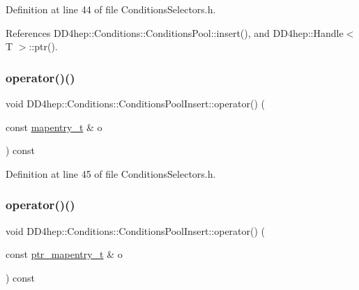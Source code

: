 Definition at line 44 of file Conditions\+Selectors.\+h.



References D\+D4hep\+::\+Conditions\+::\+Conditions\+Pool\+::insert(), and D\+D4hep\+::\+Handle$<$ T $>$\+::ptr().

\hypertarget{class_d_d4hep_1_1_conditions_1_1_conditions_pool_insert_aaf1f6d30abd4d82d50b23f326feb7922}{}\label{class_d_d4hep_1_1_conditions_1_1_conditions_pool_insert_aaf1f6d30abd4d82d50b23f326feb7922} 
\subsubsection{\texorpdfstring{operator()()}{operator()()}\hspace{0.1cm}{\footnotesize\ttfamily [3/4]}}
{\footnotesize\ttfamily void D\+D4hep\+::\+Conditions\+::\+Conditions\+Pool\+Insert\+::operator() (\begin{DoxyParamCaption}\item[{const \hyperlink{class_d_d4hep_1_1_conditions_1_1_cond_____oper_a877dac3da66795207aed15be219acbdc}{mapentry\+\_\+t} \&}]{o }\end{DoxyParamCaption}) const\hspace{0.3cm}{\ttfamily [inline]}}



Definition at line 45 of file Conditions\+Selectors.\+h.

\hypertarget{class_d_d4hep_1_1_conditions_1_1_conditions_pool_insert_a4b947b6b213d05d4d84c9a36c6344a69}{}\label{class_d_d4hep_1_1_conditions_1_1_conditions_pool_insert_a4b947b6b213d05d4d84c9a36c6344a69} 
\subsubsection{\texorpdfstring{operator()()}{operator()()}\hspace{0.1cm}{\footnotesize\ttfamily [4/4]}}
{\footnotesize\ttfamily void D\+D4hep\+::\+Conditions\+::\+Conditions\+Pool\+Insert\+::operator() (\begin{DoxyParamCaption}\item[{const \hyperlink{class_d_d4hep_1_1_conditions_1_1_cond_____oper_a0949e4bd5f90cd3fae2394cf30983973}{ptr\+\_\+mapentry\+\_\+t} \&}]{o }\end{DoxyParamCaption}) const\hspace{0.3cm}{\ttfamily [inline]}}



